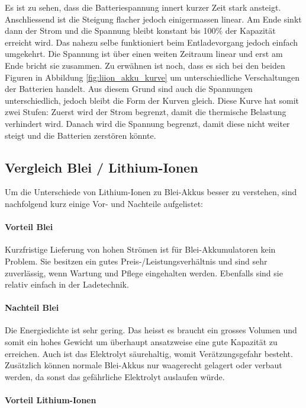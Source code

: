Es ist zu sehen, dass die Batteriespannung innert kurzer Zeit stark ansteigt. Anschliessend ist die Steigung flacher jedoch einigermassen linear. Am Ende sinkt dann der Strom und die Spannung bleibt konstant bis 100\% der Kapazität erreicht wird.
Das nahezu selbe funktioniert beim Entladevorgang jedoch einfach umgekehrt. Die Spannung ist über einen weiten Zeitraum linear und erst am Ende bricht sie zusammen.
Zu erwähnen ist noch, dass es sich bei den beiden Figuren in Abbildung \ref{fig:liion_akku_kurve} um unterschiedliche Verschaltungen der Batterien handelt. Aus diesem Grund sind auch die Spannungen unterschiedlich, jedoch bleibt die Form der Kurven gleich. Diese Kurve hat somit zwei Stufen: Zuerst wird der Strom begrenzt, damit die thermische Belastung verhindert wird. Danach wird die Spannung begrenzt, damit diese nicht weiter steigt und die Batterien zerstören könnte.

\newpage

\subsection{Vergleich Blei / Lithium-Ionen} \label{kap:Vergleich_liion_pb}

Um die Unterschiede von Lithium-Ionen zu Blei-Akkus besser zu verstehen, sind nachfolgend kurz einige Vor- und Nachteile aufgelistet:

\paragraph{Vorteil Blei}

Kurzfristige Lieferung von hohen Strömen ist für Blei-Akkumulatoren kein Problem. Sie besitzen ein gutes Preis-/Leistungsverhältnis und sind sehr zuverlässig, wenn Wartung und Pflege eingehalten werden. Ebenfalls sind sie relativ einfach in der Ladetechnik.

\paragraph{Nachteil Blei}

Die Energiedichte ist sehr gering. Das heisst es braucht ein grosses Volumen und somit ein hohes Gewicht um überhaupt ansatzweise eine gute Kapazität zu erreichen. Auch ist das Elektrolyt säurehaltig, womit Verätzungsgefahr besteht. Zusätzlich können normale Blei-Akkus nur waagerecht gelagert oder verbaut werden, da sonst das gefährliche Elektrolyt auslaufen würde.

\paragraph{Vorteil Lithium-Ionen}

